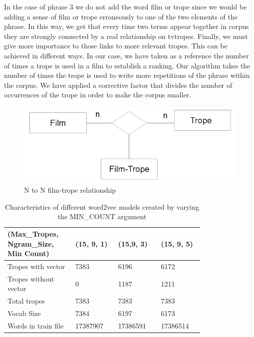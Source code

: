\documentclass[letterpaper]{article}
\begin{document}
In the case of phrase 3 we do not add the word film or trope since we would be adding a sense of film or trope erroneously to one of the two elements of the phrase.
In this way, we get that every time two terms appear together in corpus they are strongly connected by a real relationship on tvtropes. Finally, we must give more importance to those links to more relevant tropes. This can be achieved in different ways. In our case, we have taken as a reference the number of times a trope is used in a film to establish a ranking. Our algorithm takes the number of times the trope is used to write more repetitions of the phrase within the corpus. We have applied a corrective factor that divides the number of occurrences of the trope in order to make the corpus smaller.
	
	   \begin{figure}
	\centering
	\includegraphics[width=1\linewidth]{../images/trope-film-n-to-n.png}
	\caption{N to N film-trope relationship}
	\label{fig:film-trope-relationship}
	\end{figure}
	
	
	
	\begin{table}[t]
	\centering
	\begin{tabular}{|p{0.24\linewidth}|p{0.18\linewidth}|p{0.18\linewidth}|p{0.18\linewidth}|}
	\hline
	\textbf{(Max\_Tropes, Ngram\_Size, Min Count)}& \textbf{(15, 9, 1)} & \textbf{(15,9, 3)} & \textbf{(15, 9, 5)}\\
	\hline
	\hline
	Tropes with vector&7383  & 6196 & 6172 \\
	\hline
	Tropes without vector& 0 & 1187 & 1211 \\
	\hline
	Total tropes&7383&7383&7383\\
	\hline
	Vocab Size& 7384 & 6197 & 6173 \\
	\hline
	Words in train file& 17387907 & 17386591 & 17386514 \\
	\hline 
	
	\end{tabular}
	\caption{Characteristics of different word2vec models created by varying the MIN\_COUNT argument}
	\label{tab:variations-with-min-count-argument-15-9}
	\end{table}    
	
\end{document}
